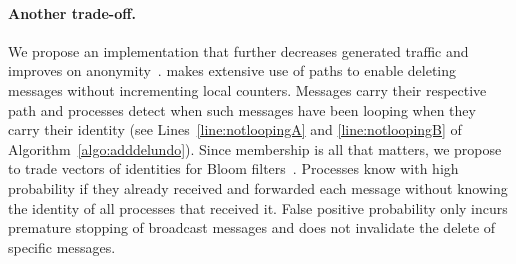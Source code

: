 \paragraph{Another trade-off.}
We propose an implementation that further decreases generated traffic
and improves on anonymity~\cite{whitaker2002forwarding}.  \NAME makes
extensive use of paths to enable deleting messages without
incrementing local counters. Messages carry their respective path and
processes detect when such messages have been looping when they carry
their identity (see Lines~\ref{line:notloopingA} and
\ref{line:notloopingB} of Algorithm~\ref{algo:adddelundo}). Since
membership is all that matters, we propose to trade vectors of
identities for Bloom filters~\cite{almeida2007scalable}. Processes
know with high probability if they already received and forwarded each
message without knowing the identity of all processes that received
it.  False positive probability only incurs premature stopping of
broadcast messages and does not invalidate the delete of specific
messages.









